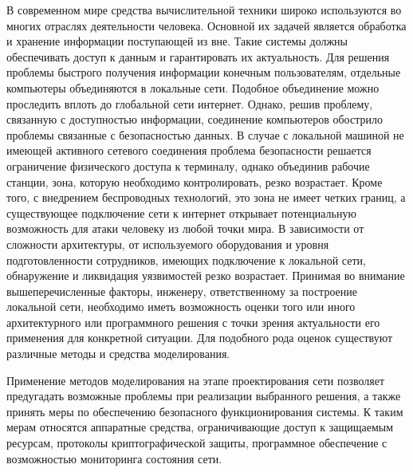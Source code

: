 
В современном мире средства вычислительной техники широко используются во многих отраслях деятельности человека. Основной их задачей является обработка и хранение информации поступающей из вне. Такие системы должны обеспечивать доступ к данным и гарантировать их актуальность. Для решения проблемы быстрого получения информации конечным пользователям, отдельные компьютеры объединяются в локальные сети. Подобное объединение можно проследить вплоть до глобальной сети интернет. Однако, решив проблему, связанную с доступностью информации, соединение компьютеров обострило проблемы связанные с безопасностью данных. В случае с локальной машиной не имеющей активного сетевого соединения проблема безопасности решается ограничение физического доступа к терминалу, однако объединив рабочие станции, зона, которую необходимо контролировать, резко возрастает. Кроме того, с внедрением беспроводных технологий, это зона не имеет четких границ, а существующее подключение сети к интернет открывает потенциальную возможность для атаки человеку из любой точки мира. В зависимости от сложности архитектуры, от используемого оборудования и уровня подготовленности сотрудников, имеющих подключение к локальной сети, обнаружение и ликвидация уязвимостей резко возрастает. Принимая во внимание вышеперечисленные факторы, инженеру, ответственному за построение локальной сети, необходимо иметь возможность оценки того или иного архитектурного или программного решения с точки зрения актуальности его применения для конкретной ситуации. Для подобного рода оценок существуют различные методы и средства моделирования.


  Применение методов моделирования на этапе проектирования сети позволяет предугадать возможные проблемы при реализации выбранного решения, а также принять меры по обеспечению безопасного функционирования системы. К таким мерам относятся аппаратные средства, ограничивающие доступ к защищаемым ресурсам, протоколы криптографической защиты, программное обеспечение с возможностью мониторинга состояния сети.

